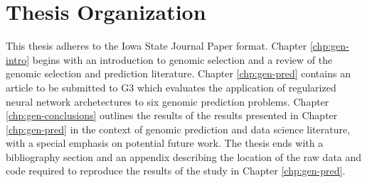 \section{Thesis Organization}

This thesis adheres to the Iowa State Journal Paper format. 
Chapter \ref{chp:gen-intro} begins with an introduction to genomic selection and a review of the
genomic selection and prediction literature. Chapter \ref{chp:gen-pred} contains an article to be 
submitted to G3 which evaluates the application of regularized neural network archetectures to six genomic
prediction problems. Chapter \ref{chp:gen-conclusions} outlines the results of the results presented
in Chapter \ref{chp:gen-pred} in the context of genomic prediction and data science literature, with a special
emphasis on potential future work. The thesis ends with a bibliography section and an appendix describing
the location of the raw data and code required to reproduce the results of the study in Chapter \ref{chp:gen-pred}.


